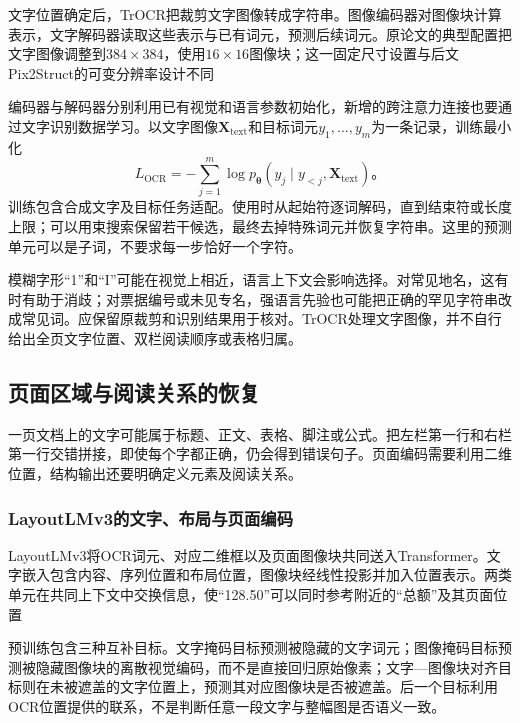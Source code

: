 文字位置确定后，TrOCR把裁剪文字图像转成字符串。图像编码器对图像块计算表示，文字解码器读取这些表示与已有词元，预测后续词元。原论文的典型配置把文字图像调整到$384\times384$，使用$16\times16$图像块；这一固定尺寸设置与后文Pix2Struct的可变分辨率设计不同

编码器与解码器分别利用已有视觉和语言参数初始化，新增的跨注意力连接也要通过文字识别数据学习。以文字图像$\bm X_{\mathrm{text}}$和目标词元$y_1,\ldots,y_m$为一条记录，训练最小化
\begin{equation}
  L_{\mathrm{OCR}}
  =-\sum_{j=1}^{m}\log p_{\bm\theta}
    (y_j\mid y_{<j},\bm X_{\mathrm{text}})\text{。}
  \label{eq:vision-trocr-loss}
\end{equation}
训练包含合成文字及目标任务适配。使用时从起始符逐词解码，直到结束符或长度上限；可以用束搜索保留若干候选，最终去掉特殊词元并恢复字符串。这里的预测单元可以是子词，不要求每一步恰好一个字符。

模糊字形“1”和“I”可能在视觉上相近，语言上下文会影响选择。对常见地名，这有时有助于消歧；对票据编号或未见专名，强语言先验也可能把正确的罕见字符串改成常见词。应保留原裁剪和识别结果用于核对。TrOCR处理文字图像，并不自行给出全页文字位置、双栏阅读顺序或表格归属。

\subsection{页面区域与阅读关系的恢复}
\label{sec:vision-understanding-page}

一页文档上的文字可能属于标题、正文、表格、脚注或公式。把左栏第一行和右栏第一行交错拼接，即使每个字都正确，仍会得到错误句子。页面编码需要利用二维位置，结构输出还要明确定义元素及阅读关系。

\subsubsection{LayoutLMv3的文字、布局与页面编码}
\label{sec:vision-understanding-layoutlm}

LayoutLMv3将OCR词元、对应二维框以及页面图像块共同送入Transformer。文字嵌入包含内容、序列位置和布局位置，图像块经线性投影并加入位置表示。两类单元在共同上下文中交换信息，使“128.50”可以同时参考附近的“总额”及其页面位置

预训练包含三种互补目标。文字掩码目标预测被隐藏的文字词元；图像掩码目标预测被隐藏图像块的离散视觉编码，而不是直接回归原始像素；文字—图像块对齐目标则在未被遮盖的文字位置上，预测其对应图像块是否被遮盖。后一个目标利用OCR位置提供的联系，不是判断任意一段文字与整幅图是否语义一致。

